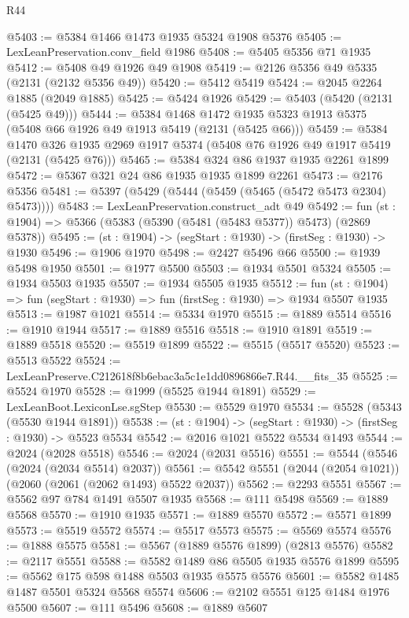 \begin{lexlean}{R44}
\begin{coremodule}
@5403 := @5384 @1466 @1473 @1935 @5324 @1908 @5376
@5405 := LexLeanPreservation.conv_field @1986
@5408 := @5405 @5356 @71 @1935
@5412 := @5408 @49 @1926 @49 @1908
@5419 := @2126 @5356 @49 @5335 (@2131 (@2132 @5356 @49))
@5420 := @5412 @5419
@5424 := @2045 @2264 @1885 (@2049 @1885)
@5425 := @5424 @1926
@5429 := @5403 (@5420 (@2131 (@5425 @49)))
@5444 := @5384
    @1468
    @1472
    @1935
    @5323
    @1913
    @5375
    (@5408 @66 @1926 @49 @1913 @5419 (@2131 (@5425 @66)))
@5459 := @5384
    @1470
    @326
    @1935
    @2969
    @1917
    @5374
    (@5408 @76 @1926 @49 @1917 @5419 (@2131 (@5425 @76)))
@5465 := @5384 @324 @86 @1937 @1935 @2261 @1899
@5472 := @5367 @321 @24 @86 @1935 @1935 @1899 @2261
@5473 := @2176 @5356
@5481 := @5397 (@5429 (@5444 (@5459 (@5465 (@5472 @5473 @2304) @5473))))
@5483 := LexLeanPreservation.construct_adt @49
@5492 := fun (st : @1904) => @5366 (@5383 (@5390 (@5481 (@5483 @5377)) @5473) (@2869 @5378))
@5495 := (st : @1904) -> (segStart : @1930) -> (firstSeg : @1930) -> @1930
@5496 := @1906 @1970
@5498 := @2427 @5496 @66
@5500 := @1939 @5498 @1950
@5501 := @1977 @5500
@5503 := @1934 @5501 @5324
@5505 := @1934 @5503 @1935
@5507 := @1934 @5505 @1935
@5512 := fun (st : @1904) => fun (segStart : @1930) => fun (firstSeg : @1930) => @1934 @5507 @1935
@5513 := @1987 @1021
@5514 := @5334 @1970
@5515 := @1889 @5514
@5516 := @1910 @1944
@5517 := @1889 @5516
@5518 := @1910 @1891
@5519 := @1889 @5518
@5520 := @5519 @1899
@5522 := @5515 (@5517 @5520)
@5523 := @5513 @5522
@5524 := LexLeanPreserve.C212618f8b6ebac3a5c1e1dd0896866e7.R44.__fits_35
@5525 := @5524 @1970
@5528 := @1999 (@5525 @1944 @1891)
@5529 := LexLeanBoot.LexiconLse.sgStep
@5530 := @5529 @1970
@5534 := @5528 (@5343 (@5530 @1944 @1891))
@5538 := (st : @1904) -> (segStart : @1930) -> (firstSeg : @1930) -> @5523 @5534
@5542 := @2016 @1021 @5522 @5534 @1493
@5544 := @2024 (@2028 @5518)
@5546 := @2024 (@2031 @5516)
@5551 := @5544 (@5546 (@2024 (@2034 @5514) @2037))
@5561 := @5542 @5551 (@2044 (@2054 @1021)) (@2060 (@2061 (@2062 @1493) @5522 @2037))
@5562 := @2293 @5551
@5567 := @5562 @97 @784 @1491 @5507 @1935
@5568 := @111 @5498
@5569 := @1889 @5568
@5570 := @1910 @1935
@5571 := @1889 @5570
@5572 := @5571 @1899
@5573 := @5519 @5572
@5574 := @5517 @5573
@5575 := @5569 @5574
@5576 := @1888 @5575
@5581 := @5567 (@1889 @5576 @1899) (@2813 @5576)
@5582 := @2117 @5551
@5588 := @5582 @1489 @86 @5505 @1935 @5576 @1899
@5595 := @5562 @175 @598 @1488 @5503 @1935 @5575 @5576
@5601 := @5582 @1485 @1487 @5501 @5324 @5568 @5574
@5606 := @2102 @5551 @125 @1484 @1976 @5500
@5607 := @111 @5496
@5608 := @1889 @5607

\end{coremodule}
\end{lexlean}

